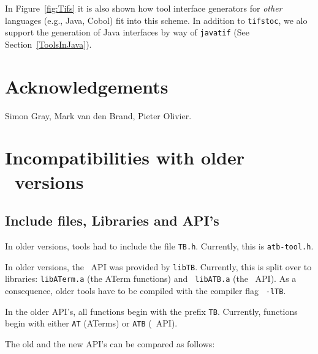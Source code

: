 \documentclass[twoside]{article} %
\begin{document}
%

In Figure~\ref{fig:Tifs} it is also shown how tool interface generators for
{\em other} languages (e.g., Java, Cobol) fit into this scheme.  In addition
to {\tt tifstoc}, we alo support the generation of Java interfaces by way of
{\tt javatif} (See Section~\ref{ToolsInJava}).



\section*{Acknowledgements}
Simon Gray, Mark van den Brand, Pieter Olivier.
\appendix


\newpage
\section{Incompatibilities with older \TB\ versions}

\subsection{Include files, Libraries and API's}

In older versions, tools had to include the file {\tt TB.h}.
Currently, this is {\tt atb-tool.h}.

In older versions, the \TB\ API was provided by {\tt libTB}.  Currently, this
is split over to libraries: {\tt libATerm.a} (the ATerm functions) and {\tt
  libATB.a} (the \TB\ API).
As a consequence, older tools have to be compiled with the compiler flag {\tt
  -lTB}.

In the older API's, all functions begin with the prefix {\tt TB}.  Currently,
functions begin with either {\tt AT} (ATerms) or {\tt ATB} (\TB\ API).

The old and the new API's can be compared as follows:
\end{document}
